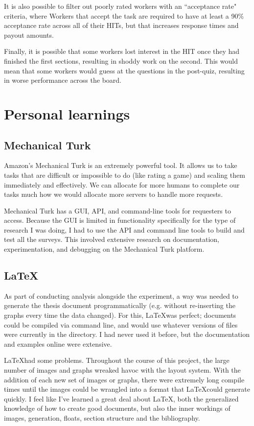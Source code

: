 \documentclass[12pt]{report}
\begin{document}
			It is also possible to filter out poorly rated workers with an ``acceptance rate" criteria, where Workers that accept the task are required to have at least a 90\% acceptance rate across all of their HITs, but that increases response times and payout amounts.

			Finally, it is possible that some workers lost interest in the HIT once they had finished the first sections, resulting in shoddy work on the second. This would mean that some workers would guess at the questions in the post-quiz, resulting in worse performance across the board.

	\section{Personal learnings}

		\subsection{Mechanical Turk}

			Amazon's Mechanical Turk is an extremely powerful tool. It allows us to take tasks that are difficult or impossible to do (like rating a game) and scaling them immediately and effectively. We can allocate for more humans to complete our tasks much how we would allocate more servers to handle more requests. 

			Mechanical Turk has a GUI, API, and command-line tools for requesters to access. Because the GUI is limited in functionality specifically for the type of research I was doing, I had to use the API and command line tools to build and test all the surveys. This involved extensive research on documentation, experimentation, and debugging on the Mechanical Turk platform.

		\subsection{\LaTeX}

			As part of conducting analysis alongside the experiment, a way was needed to generate the thesis document programmatically (e.g. without re-inserting the graphs every time the data changed). For this, \LaTeX was perfect; documents could be compiled via command line, and would use whatever versions of files were currently in the directory. I had never used it before, but the documentation and examples online were extensive.

			\LaTeX had some problems. Throughout the course of this project, the large number of images and graphs wreaked havoc with the layout system. With the addition of each new set of images or graphs, there were extremely long compile times until the images could be wrangled into a format that \LaTeX could generate quickly. I feel like I've learned a great deal about \LaTeX, both the generalized knowledge of how to create good documents, but also the inner workings of images, generation, floats, section structure and the bibliography.
\end{document}
